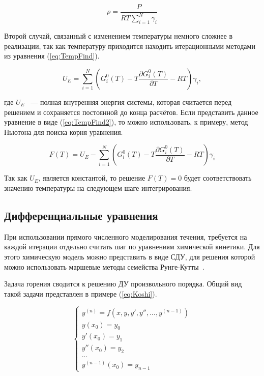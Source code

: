 \begin{equation}
    \rho = \dfrac{P}{RT\sum\limits_{i = 1}^{N}\gamma_i}
    \label{eq:Rho}
\end{equation}

Второй случай, связанный с изменением температуры немного сложнее в реализации, так как температуру приходится находить итерационными
методами из уравнения (\ref{eq:TempFind}).

\begin{equation}
    U_E = \sum\limits_{i = 1}^{N}(G_i^0(T) - T\dfrac{\partial G_i^0(T)}{\partial T} - RT)\gamma_i,
    \label{eq:TempFind}
\end{equation}

где $U_E$ ~--- полная внутренняя энергия системы, которая считается перед решением и сохраняется постоянной до конца расчётов. Если
представить данное уравнение в виде (\ref{eq:TempFind2}), то можно использовать, к примеру, метод Ньютона для поиска корня уравнения.

\begin{equation}
    F(T) = U_E - \sum\limits_{i = 1}^{N}(G_i^0(T) - T\dfrac{\partial G_i^0(T)}{\partial T} - RT)\gamma_i
    \label{eq:TempFind2}
\end{equation}

Так как $U_E$, является константой, то решение $F(T) = 0$ будет соответствовать значению температуры на следующем шаге интегрирования.

\subsection{Дифференциальные уравнения}

При использовании прямого численного моделирования течения, требуется на каждой итерации отдельно считать шаг по уравнениям химической кинетики. Для этого химическую модель можно представить в виде СДУ, для решения которой можно использовать маршевые методы семейства Рунге-Кутты~\cite{book6, book9}.

Задача горения сводится к решению ДУ произвольного порядка. Общий вид такой задачи представлен в примере (\ref{eq:Koshi}).

\begin{equation}
    \begin{cases}
        y^{(n)} = f(x, y, y', y'', ..., y^{(n - 1)})\\
        y(x_0) = y_0\\
        y'(x_0) = y_1\\
        y''(x_0) = y_2\\
        ...\\
        y^{(n - 1)}(x_0) = y_{n - 1}
    \end{cases}
    \label{eq:Koshi}
\end{equation}

